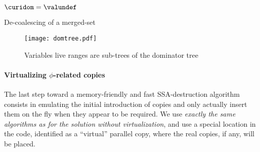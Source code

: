 \begin{algorithm}[h]
$\curidom=\valundef$\;
\BlankLine
\BlankLine
{}
\caption{\label{alg:alternative_ssa_destruction:domup} De-coalescing of 
a merged-set}
\end{algorithm}

\begin{figure}
\texttt{[image: domtree.pdf]}
\caption{\label{fig:alternative_ssa_destruction:fig:domtree}Variables live ranges are sub-trees of the dominator tree}
\end{figure}


\paragraph{Virtualizing $\phi$-related copies}
The last step toward a memory-friendly and fast SSA-destruction algorithm consists in emulating the initial introduction of copies  and only actually insert them on the fly when they appear to be required. 
We use \emph{exactly the same algorithms as for the solution without virtualization}, and use a special location in the code, identified as a ``virtual'' parallel copy, where the real copies, if any, will be placed.

